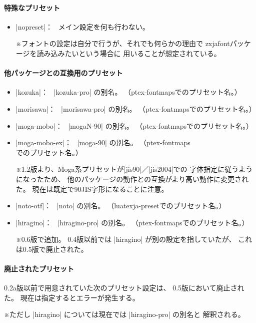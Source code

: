 \documentclass[xelatex,ja=standard,jafont=ipaex,
  a4paper]{bxjsarticle}
\newcommand{\Pkg}[1]{\textsf{#1}}
\newcommand{\Note}{\par\noindent ※}
\newcommand{\Means}{：\ }
\newcommand{\JSl}{\mbox{／}\linebreak[0]}
\begin{document}
\paragraph{特殊なプリセット}
\mbox{}

\begin{itemize}
\item |nopreset|\Means
  メイン設定を何も行わない。
  \Note フォントの設定は自分で行うが、それでも何らかの理由で
  \Pkg{zxjafont}パッケージを読み込みたいという場合に
  用いることが想定されている。
\end{itemize}

\paragraph{他パッケージとの互換用のプリセット}
\mbox{}

\begin{itemize}
\item |kozuka|\Means
  |kozuka-pro| の別名。
  （\Pkg{ptex-fontmaps}でのプリセット名。）
\item |morisawa|\Means
  |morisawa-pro| の別名。
  （\Pkg{ptex-fontmaps}でのプリセット名。）
\item |moga-mobo|\Means
  |mogaN-90| の別名。
  （\Pkg{ptex-fontmaps}でのプリセット名。）
\item |moga-mobo-ex|\Means
  |moga-90| の別名。
  （\Pkg{ptex-fontmaps}でのプリセット名。）
  \Note 1.2版より、Moga系プリセットが\>|jis90|\JSl|jis2004|\>での
  字体指定に従うようになったため、
  他のパッケージの動作との互換がより高い動作に変更された。
  現在は既定で90JIS字形になることに注意。
\item |noto-otf|\Means
  |noto| の別名。
  （\Pkg{luatexja-preset}でのプリセット名。）
\item |hiragino|\Means
  |hiragino-pro| の別名。
  （\Pkg{ptex-fontmaps}でのプリセット名。）
  \Note 0.6版で追加。
  0.4版以前では |hiragino| が別の設定を指していたが、
  これは0.5版で廃止された。
\end{itemize}

\paragraph{廃止されたプリセット}

0.2a版以前で用意されていた次のプリセット設定は、
0.5版において廃止された。
現在は指定するとエラーが発生する。

\Note ただし |hiragino| については現在では |hiragino-pro| の別名と
解釈される。
\end{document}
